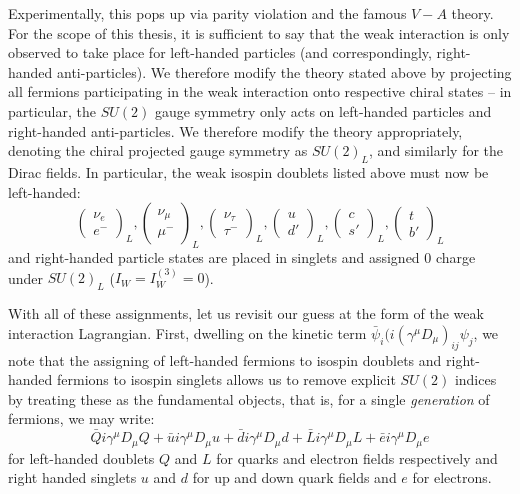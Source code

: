 Experimentally, this pops up via parity violation and the famous $V - A$ theory. 
For the scope of this thesis, it is sufficient to say that the weak interaction is only observed to take
place for left-handed particles (and correspondingly, right-handed anti-particles). We therefore modify the 
theory stated above by projecting all fermions participating in the weak interaction onto respective chiral
states -- in particular, the $SU(2)$ gauge symmetry only acts on left-handed particles and right-handed anti-particles.
We therefore modify the theory appropriately, denoting the chiral projected gauge symmetry as $SU(2)_{L}$, 
and similarly for the Dirac fields. In particular, the weak isospin doublets listed above must now be 
left-handed:
\begin{equation}
\begin{pmatrix}\nu_{e} \\ e^{-}\end{pmatrix}_L, \begin{pmatrix}\nu_{\mu} \\ \mu^{-}\end{pmatrix}_L, 
\begin{pmatrix}\nu_{\tau} \\ \tau^{-}\end{pmatrix}_L, \begin{pmatrix}u \\ d'\end{pmatrix}_L, 
\begin{pmatrix}c \\ s'\end{pmatrix}_L, \begin{pmatrix}t \\ b'\end{pmatrix}_L
\end{equation}
and right-handed particle states are placed in singlets and assigned $0$ charge under $SU(2)_{L}$ ($I_{W} = I_{W}^{(3)}=0$).

With all of these assignments, let us revisit our guess at the form of the weak interaction Lagrangian.
First, dwelling on the kinetic term $\bar{\psi}_{i}(i(\gamma^{\mu}D_{\mu})_{ij}\psi_{j}$, we note that 
the assigning of left-handed fermions to isospin doublets and right-handed fermions to 
isospin singlets allows us to remove explicit $SU(2)$ indices by treating these as the fundamental objects,
that is, for a single \emph{generation} of fermions, we may write:
\begin{equation}
\bar{Q}i\gamma^{\mu}D_{\mu}Q + \bar{u}i\gamma^{\mu}D_{\mu}u +\bar{d}i\gamma^{\mu}D_{\mu}d +\bar{L}i\gamma^{\mu}D_{\mu}L +\bar{e}i\gamma^{\mu}D_{\mu}e
\end{equation}
for left-handed doublets $Q$ and $L$ for quarks and electron fields respectively and right handed singlets 
$u$ and $d$ for up and down quark fields and $e$ for electrons.

